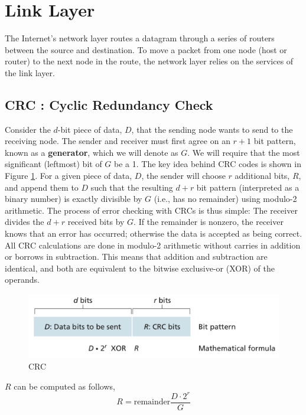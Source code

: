 \documentclass[11pt]{article}
\begin{document}
\section{Link Layer}

The Internet’s network layer routes a datagram through a series of routers between the source and destination. To move a packet from one node (host or router) to the next node in the route, the network layer relies on the services of the link layer.

\subsection{CRC : Cyclic Redundancy Check}

Consider the $d$-bit piece of data, $D$, that the sending node wants to send to the receiving node. The sender and receiver must first agree on an $r + 1$ bit pattern, known as a \textbf{generator}, which we will denote as $G$. We will require that the most significant (leftmost) bit of $G$ be a 1. The key idea behind CRC codes is shown in Figure \ref{fig:CRC}. For a given piece of data, $D$, the sender will choose $r$ additional bits, $R$, and append them to $D$ such that the resulting $d + r$ bit pattern (interpreted as a binary number) is exactly divisible by $G$ (i.e., has no remainder) using modulo-2 arithmetic. The process of error checking with CRCs is thus simple: The receiver divides the $d + r$ received bits by $G$. If the remainder is nonzero, the receiver knows that an error has occurred; otherwise the data is accepted as being correct. All CRC calculations are done in modulo-2 arithmetic without carries in addition or borrows in subtraction. This means that addition and subtraction are identical, and both are equivalent to the bitwise exclusive-or (XOR) of the operands. 

\begin{figure}[h]
	\centering
	\includegraphics[width=0.7\linewidth]{images/CRC.png}
	\caption{CRC}
	\label{fig:CRC}
\end{figure}

$R$ can be computed as follows, 
\[
	R = \mathrm{remainder} \frac{D \cdot 2^r}{G}
\]
\end{document}
